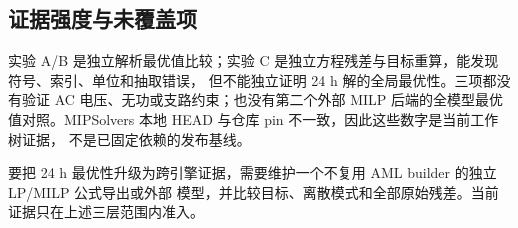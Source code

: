 \subsection{证据强度与未覆盖项}

实验 A/B 是独立解析最优值比较；实验 C 是独立方程残差与目标重算，能发现符号、索引、单位和抽取错误，
但不能独立证明 24 h 解的全局最优性。三项都没有验证 AC 电压、无功或支路约束；也没有第二个外部 MILP
后端的全模型最优值对照。MIPSolvers 本地 HEAD 与仓库 pin 不一致，因此这些数字是当前工作树证据，
不是已固定依赖的发布基线。

\begin{gapnote}
要把 24 h 最优性升级为跨引擎证据，需要维护一个不复用 AML builder 的独立 LP/MILP 公式导出或外部
模型，并比较目标、离散模式和全部原始残差。当前证据只在上述三层范围内准入。
\end{gapnote}
